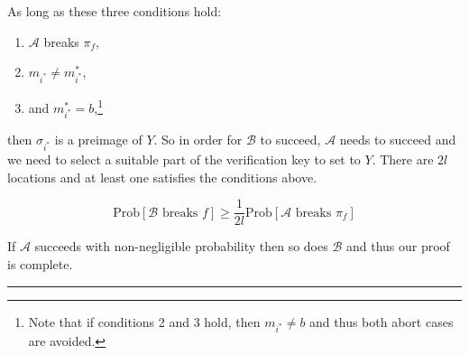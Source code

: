 \documentclass[twoside]{article}
\newenvironment{proof}{{\bf Proof:}}{\hfill\rule{2mm}{2mm}}
\begin{document}
\begin{proof}
As long as these three conditions hold:
\begin{enumerate}
\item $\mathcal{A}$ breaks $\pi_f$,
\item $m_{i^*} \neq m^*_{i^*}$,
\item and $m^*_{i^*} = b$,\footnote{Note that if conditions 2 and 3 hold, then $m_{i^*} \neq b$ and thus both abort cases are avoided.}
\end{enumerate}

then $\sigma_{i^*}$ is a preimage of $Y$. So in order for $\mathcal{B}$ to succeed, $\mathcal{A}$ needs to succeed and we need to select a suitable part of the verification key to set to $Y$. There are $2l$ locations and at least one satisfies the conditions above.

$$\text{Prob}[\mathcal{B}\text{ breaks }f] \geq \frac{1}{2l}\text{Prob}[\mathcal{A}\text{ breaks }\pi_f]$$

If $\mathcal{A}$ succeeds with non-negligible probability then so does $\mathcal{B}$ and thus our proof is complete.
\end{proof}
\end{document}
